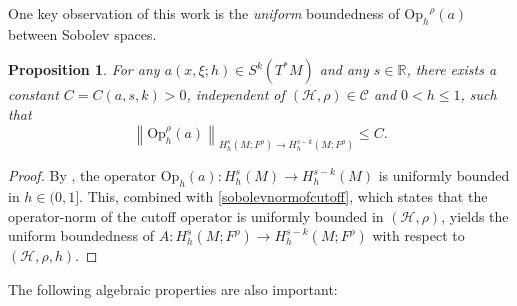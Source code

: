 \documentclass[11pt,oneside,reqno]{amsart}
\newcommand\Oph{\ensuremath{\mathrm{Op}_h}}
\newtheorem{proposition}[theorem]{Proposition}
\theoremstyle{definition}
\numberwithin{equation}{section}
\theoremstyle{plain}
\begin{document}
One key observation of this work is the \emph{uniform} boundedness of $\Oph^{\rho}(a)$ between Sobolev spaces. 


\begin{proposition}\label{uniformboundedtheorem}
 For any $a(x, \xi ; h) \in S^k\left(T^* M\right)$ and any $s \in \mathbb{R}$, there exists a constant $C=C(a, s, k)>0$, independent of $( \mathcal{H},\rho) \in \mathcal{C}$ and $0<h\leq 1$, such that
\begin{equation}
\left\|\mathrm{Op}_h^\rho(a)\right\|_{H_h^s\left(M;F^{\rho}\right) \rightarrow H_h^{s-k}\left(M;F^{\rho}\right)} \leq C .
\end{equation}
\end{proposition}
\begin{proof}
By \cite[Proposition E.22]{dyatlovzworski2019resonances}, the operator $\Oph(a): H^{s}_{h}(M)\to H^{s-k}_{h}(M)$ is uniformly bounded in $h\in(0,1]$. This, combined with \eqref{sobolevnormofcutoff}, which states that the operator-norm of the cutoff operator is uniformly bounded in $(\mathcal{H},\rho)$, yields the uniform boundedness of $A: H^{s}_{h}(M;F^{\rho})\to H^{s-k}_{h}(M;F^{\rho})$ with respect to $(\mathcal{H},\rho,h)$.
\end{proof}

The following algebraic properties are also important:
\end{document}
